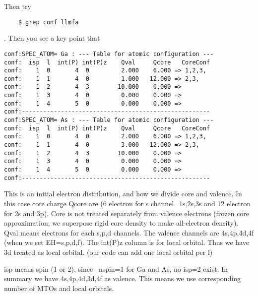 \documentclass[a4paper,10pt,epsf,fleqn]{article}
\begin{document}
Then try
\begin{verbatim}
    $ grep conf llmfa
\end{verbatim}
. Then you see a key point that
\begin{verbatim}
conf:SPEC_ATOM= Ga : --- Table for atomic configuration ---
conf:  isp  l  int(P) int(P)z    Qval     Qcore   CoreConf
conf:    1  0       4  0         2.000    6.000 => 1,2,3,
conf:    1  1       4  0         1.000   12.000 => 2,3,
conf:    1  2       4  3        10.000    0.000 => 
conf:    1  3       4  0         0.000    0.000 => 
conf:    1  4       5  0         0.000    0.000 => 
conf:-----------------------------------------------------
conf:SPEC_ATOM= As : --- Table for atomic configuration ---
conf:  isp  l  int(P) int(P)z    Qval     Qcore   CoreConf
conf:    1  0       4  0         2.000    6.000 => 1,2,3,
conf:    1  1       4  0         3.000   12.000 => 2,3,
conf:    1  2       4  3        10.000    0.000 => 
conf:    1  3       4  0         0.000    0.000 => 
conf:    1  4       5  0         0.000    0.000 => 
conf:-----------------------------------------------------
\end{verbatim}
This is an initial electron distribution, and how we divide 
core and valence. In this case core charge Qcore are (6 electron for s channel=1s,2s,3s
and 12 electron for 2s and 3p). Core is not treated separately from valence electrons
(frozen core approximation; we superpose rigid core density to make
all-electron density). Qval means electrons for each s,p,d channels.
The valence channels are 4s,4p,4d,4f (when we set EH=s,p,d,f). 
The int(P)z column is for local orbital. Thus we have 3d treated as
local orbital. (our code can add one local orbital per l)

isp means spin (1 or 2), since --nspin=1 for Ga and As, no isp=2 exist.
In summary we have 4s,4p,4d,3d,4f as valence. 
This means we use corresponding number of MTOs and local orbitals.
\end{document}
